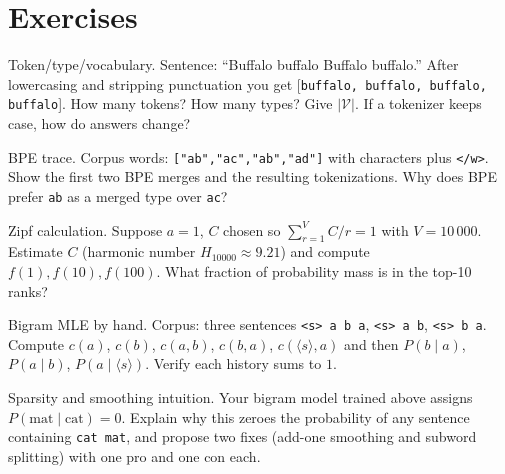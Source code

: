 \section{Exercises}
\begin{exercise} Token/type/vocabulary. Sentence: ``Buffalo buffalo Buffalo buffalo.'' After lowercasing and stripping punctuation you get [\texttt{buffalo, buffalo, buffalo, buffalo}]. How many tokens? How many types? Give $|\mathcal{V}|$. If a tokenizer keeps case, how do answers change? \end{exercise}
\begin{exercise} BPE trace. Corpus words: \texttt{["ab","ac","ab","ad"]} with characters plus \texttt{</w>}. Show the first two BPE merges and the resulting tokenizations. Why does BPE prefer \texttt{ab} as a merged type over \texttt{ac}? \end{exercise}
\begin{exercise} Zipf calculation. Suppose $a=1$, $C$ chosen so $\sum_{r=1}^{V} C/r =1$ with $V=10\,000$. Estimate $C$ (harmonic number $H_{10000}\approx 9.21$) and compute $f(1), f(10), f(100)$. What fraction of probability mass is in the top-10 ranks? \end{exercise}
\begin{exercise} Bigram MLE by hand. Corpus: three sentences \texttt{<s> a b a}, \texttt{<s> a b}, \texttt{<s> b a}. Compute $c(a)$, $c(b)$, $c(a,b)$, $c(b,a)$, $c(\langle s\rangle,a)$ and then $P(b\mid a)$, $P(a\mid b)$, $P(a\mid \langle s\rangle)$. Verify each history sums to $1$. \end{exercise}
\begin{exercise} Sparsity and smoothing intuition. Your bigram model trained above assigns $P(\text{mat}\mid\text{cat})=0$. Explain why this zeroes the probability of any sentence containing \texttt{cat mat}, and propose two fixes (add-one smoothing and subword splitting) with one pro and one con each. \end{exercise}

